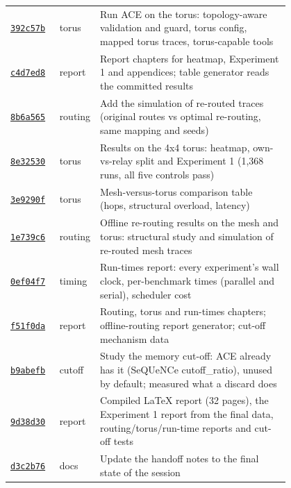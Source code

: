 {\begin{longtable}{@{}lp{0.12\linewidth}p{0.68\linewidth}@{}}
\href{https://github.com/sanjeevkrishnaa/Compiler-Driven-ACE/commit/392c57b}{\texttt{392c57b}} & torus & Run ACE on the torus: topology-aware validation and guard, torus config, mapped torus traces, torus-capable tools \\
\href{https://github.com/sanjeevkrishnaa/Compiler-Driven-ACE/commit/c4d7ed8}{\texttt{c4d7ed8}} & report & Report chapters for heatmap, Experiment 1 and appendices; table generator reads the committed results \\
\href{https://github.com/sanjeevkrishnaa/Compiler-Driven-ACE/commit/8b6a565}{\texttt{8b6a565}} & routing & Add the simulation of re-routed traces (original routes vs optimal re-routing, same mapping and seeds) \\
\href{https://github.com/sanjeevkrishnaa/Compiler-Driven-ACE/commit/8e32530}{\texttt{8e32530}} & torus & Results on the 4x4 torus: heatmap, own-vs-relay split and Experiment 1 (1,368 runs, all five controls pass) \\
\href{https://github.com/sanjeevkrishnaa/Compiler-Driven-ACE/commit/3e9290f}{\texttt{3e9290f}} & torus & Mesh-versus-torus comparison table (hops, structural overload, latency) \\
\href{https://github.com/sanjeevkrishnaa/Compiler-Driven-ACE/commit/1e739c6}{\texttt{1e739c6}} & routing & Offline re-routing results on the mesh and torus: structural study and simulation of re-routed mesh traces \\
\href{https://github.com/sanjeevkrishnaa/Compiler-Driven-ACE/commit/0ef04f7}{\texttt{0ef04f7}} & timing & Run-times report: every experiment's wall clock, per-benchmark times (parallel and serial), scheduler cost \\
\href{https://github.com/sanjeevkrishnaa/Compiler-Driven-ACE/commit/f51f0da}{\texttt{f51f0da}} & report & Routing, torus and run-times chapters; offline-routing report generator; cut-off mechanism data \\
\href{https://github.com/sanjeevkrishnaa/Compiler-Driven-ACE/commit/b9abefb}{\texttt{b9abefb}} & cutoff & Study the memory cut-off: ACE already has it (SeQUeNCe cutoff\_ratio), unused by default; measured what a discard does \\
\href{https://github.com/sanjeevkrishnaa/Compiler-Driven-ACE/commit/9d38d30}{\texttt{9d38d30}} & report & Compiled LaTeX report (32 pages), the Experiment 1 report from the final data, routing/torus/run-time reports and cut-off tests \\
\href{https://github.com/sanjeevkrishnaa/Compiler-Driven-ACE/commit/d3c2b76}{\texttt{d3c2b76}} & docs & Update the handoff notes to the final state of the session \\

\end{longtable}}
